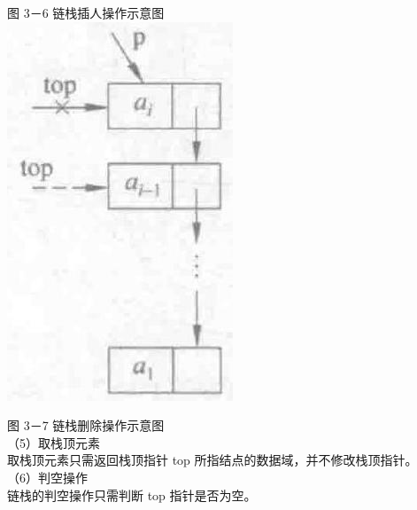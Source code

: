 \documentclass[10pt]{article}
\begin{document}
图 3－6 链栈插人操作示意图\\
\includegraphics[max width=\textwidth, center]{2025_06_06_704745ea57b15b2333e5g-089(3)}

图 3－7 链栈删除操作示意图\\
（5）取栈顶元素\\
取栈顶元素只需返回栈顶指针 top 所指结点的数据域，并不修改栈顶指针。\\
（6）判空操作\\
链栈的判空操作只需判断 top 指针是否为空。
\end{document}
